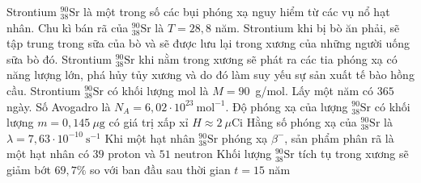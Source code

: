 	\begin{ex}%
		Strontium ${}^{90}_{38}\text{Sr}$ là một trong số các bụi phóng xạ nguy hiểm từ các vụ nổ hạt nhân. Chu kì bán rã của ${}^{90}_{38}\text{Sr}$ là $T=28{,}8$ năm. Strontium khi bị bò ăn phải, sẽ tập trung trong sữa của bò và sẽ được lưu lại trong xương của những người uống sữa bò đó. Strontium ${}^{90}_{38}\text{Sr}$ khi nằm trong xương sẽ phát ra các tia phóng xạ có năng lượng lớn, phá hủy tủy xương và do đó làm suy yếu sự sản xuất tế bào hồng cầu. Strontium ${}^{90}_{38}\text{Sr}$ có khối lượng mol là $M=90$~g/mol. Lấy một năm có $365$ ngày. Số Avogadro là $N_A=6{,}02\cdot 10^{23}~\text{mol}^{-1}$.
		\choiceTFt
		{Độ phóng xạ của lượng ${}^{90}_{38}\text{Sr}$ có khối lượng $m=0{,}145~\mu\text{g}$ có giá trị xấp xỉ $H\approx 2~\mu\text{Ci}$}
		{\True Hằng số phóng xạ của ${}^{90}_{38}\text{Sr}$ là $\lambda=7{,}63\cdot 10^{-10}~\text{s}^{-1}$}
		{\True Khi một hạt nhân ${}^{90}_{38}\text{Sr}$ phóng xạ $\beta^-$, sản phẩm phân rã là một hạt nhân có $39$ proton và $51$ neutron}
		{Khối lượng ${}^{90}_{38}\text{Sr}$ tích tụ trong xương sẽ giảm bớt $69{,}7\%$ so với ban đầu sau thời gian $t=15$ năm}
	\end{ex}


